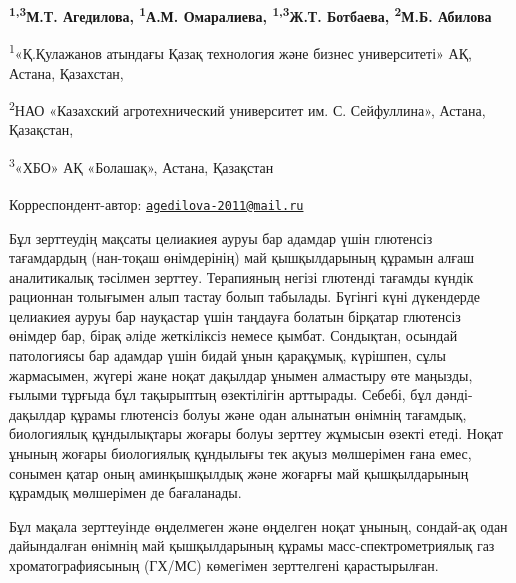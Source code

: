 
\begin{articleheader}


{\bfseries \textsuperscript{1,3}М.Т. Агедилова\textsuperscript{\envelope },
\textsuperscript{1}А.М. Омаралиева, \textsuperscript{1,3}Ж.Т. Ботбаева,
\textsuperscript{2}М.Б. Абилова}
\end{articleheader}
\begin{affiliation}

\textsuperscript{1}«Қ.Қулажанов атындағы Қазақ технология және бизнес
университеті» АҚ, Астана, Қазахстан,

\textsuperscript{2}НАО «Казахский агротехнический университет им. С.
Сейфуллина», Астана, Қазақстан,

\textsuperscript{3}«ХБО» АҚ «Болашақ», Астана, Қазақстан


{\bfseries \textsuperscript{\envelope }}Корреспондент-автор:
\href{mailto:agedilova-2011@mail.ru}{\nolinkurl{agedilova-2011@mail.ru}}

\end{affiliation}

Бұл зерттеудің мақсаты целиакиея ауруы бар адамдар үшін глютенсіз
тағамдардың (нан-тоқаш өнімдерінің) май қышқылдарының құрамын алғаш
аналитикалық тәсілмен зерттеу. Терапияның негізі глютенді тағамды күндік
рационнан толығымен алып тастау болып табылады. Бүгінгі күні дүкендерде
целиакиея ауруы бар науқастар үшін таңдауға болатын бірқатар глютенсіз
өнімдер бар, бірақ әліде жеткіліксіз немесе қымбат. Сондықтан, осындай
патологиясы бар адамдар үшін бидай ұнын қарақұмық, күрішпен, сұлы
жармасымен, жүгері жане ноқат дақылдар ұнымен алмастыру өте маңызды,
ғылыми тұрғыда бұл тақырыптың өзектілігін арттырады. Себебі, бұл дәнді-
дақылдар құрамы глютенсіз болуы және одан алынатын өнімнің тағамдық,
биологиялық құндылықтары жоғары болуы зерттеу жұмысын өзекті етеді.
Ноқат ұнының жоғары биологиялық құндылығы тек ақуыз мөлшерімен ғана
емес, сонымен қатар оның аминқышқылдық және жоғарғы май қышқылдарының
құрамдық мөлшерімен де бағаланады.

Бұл мақала зерттеуінде өңделмеген және өңделген ноқат ұнының, сондай-ақ
одан дайындалған өнімнің май қышқылдарының құрамы масс-спектрометриялық
газ хроматографиясының (ГХ/МС) көмегімен зерттелгені қарастырылған.

